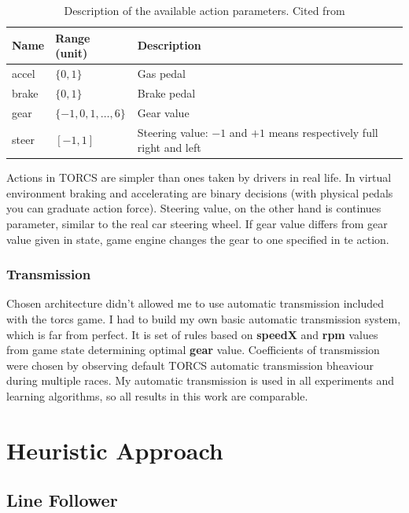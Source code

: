 \documentclass[declaration,shortabstract,english,inz]{iithesis}
\begin{document}
\begin{table}[h]
    \centering
    \begin{tabular}{|p{1.2cm}|p{2.8cm}|p{8.5cm}|}
        \hline
        \textbf{Name} & \textbf{Range (unit)} & \textbf{Description} \\ 
        \hline
        accel & $\{0,1\}$ & Gas pedal \\ 
     \hline
     brake &  $\{0,1\}$ & Brake pedal \\ 
     \hline
     gear & $\{-1,0,1,\dots ,6\}$ & Gear value \\ 
     \hline
     steer &  $[-1,1]$ & Steering value: $-1$ and $+1$ means respectively full right and
     left \\ 
     \hline
    \end{tabular}
    
    \caption{\label{tab:torcs_actions}Description of the available  action parameters. Cited from \cite{scrc_manual}}
\end{table}

Actions in TORCS are simpler than ones taken by drivers in real life.
In virtual environment braking and accelerating are binary decisions (with physical pedals you can graduate action force).
Steering value, on the other hand is continues parameter, similar to the real car steering wheel.
If gear value differs from  gear value given in state, game engine changes the gear to one specified in te action.

\subsection{Transmission}


Chosen architecture didn’t allowed me to use automatic transmission included with the torcs game.
I had to build my own basic automatic transmission system, which is far from perfect.
It is set of rules based on \textbf{speedX} and \textbf{rpm} values from game state determining optimal \textbf{gear} value.
Coefficients of transmission were chosen by observing default TORCS automatic transmission bheaviour during multiple races.
My automatic transmission is used in all experiments and learning algorithms, so all results in this work are comparable.


\chapter{Heuristic Approach}

\section{Line Follower}
\end{document}

